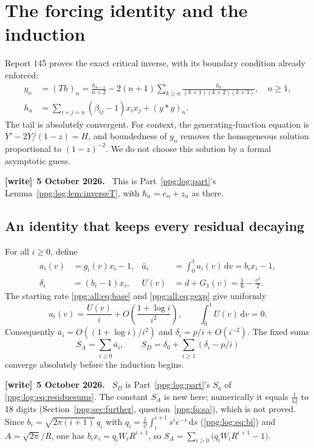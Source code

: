 \documentclass[11pt,letterpaper]{article}
\theoremstyle{remark}\newtheorem{remark}[theorem]{Remark}
\numberwithin{equation}{section}
\newcommand{\dd}{\mathrm d}
\newenvironment{writenote}[1][]{\par\smallskip\begingroup\small
 \noindent\textbf{[write]}\if\relax\detokenize{#1}\relax\else~\textbf{#1.}\fi\ }%
 {\par\endgroup\smallskip}
\begin{document}
\section{The forcing identity and the induction}\label{ppg:all:sec:induction}
Report 145 proves the exact critical inverse, with its boundary condition already enforced:
\begin{align}
 y_n&=(Th)_n=\frac{h_{n-1}}{n+2}
       -2(n+1)\sum_{k\ge n}\frac{h_k}{(k+1)(k+2)(k+3)},\quad n\ge1,
 \label{ppg:all:eq:T}\\
 h_n&=\sum_{i+j=n}(\beta_{ij}-1)x_ix_j+(y*y)_n.
 \label{ppg:all:eq:hdef}
\end{align}
The tail is absolutely convergent. For context, the generating-function equation is
$Y'-2Y/(1-z)=H$, and boundedness of $y_n$ removes the homogeneous solution proportional to $(1-z)^{-2}$. We do not choose this solution by a formal asymptotic guess.
\begin{writenote}[5 October 2026]
This is Part~\ref{ppg:log:part}'s Lemma~\ref{ppg:log:lem:inverseT}, with $h_n=e_n+z_n$ as there.
\end{writenote}

\subsection{An identity that keeps every residual decaying}
For all $i\ge0$, define
\begin{align}
 a_i(v)&=g_i(v)x_i-1,&\bar a_i&=\int_0^1a_i(v)\,\dd v=b_ix_i-1,
 \label{ppg:all:eq:an}\\
 \delta_i&=(b_i-1)x_i,& U(v)&=d+G_1(v)=\frac16-\frac{v^2}2.
 \label{ppg:all:eq:delta}
\end{align}
The starting rate \eqref{ppg:all:eq:base} and \eqref{ppg:all:eq:gexp} give uniformly
\begin{equation}\label{ppg:all:eq:U}
 a_i(v)=\frac{U(v)}i+O\!\left(\frac{1+\log i}{i^2}\right),\qquad
 \int_0^1U(v)\,\dd v=0.
\end{equation}
Consequently $\bar a_i=O((1+\log i)/i^2)$ and
$\delta_i=p/i+O(i^{-2})$. The fixed sums
\begin{equation}\label{ppg:all:eq:SA}
 S_A=\sum_{i\ge0}\bar a_i,\qquad
 S_D=\delta_0+\sum_{i\ge1}(\delta_i-p/i)
\end{equation}
converge absolutely before the induction begins.
\begin{writenote}[5 October 2026]
$S_D$ is Part~\ref{ppg:log:part}'s $S_a$ of \eqref{ppg:log:eq:residuesums}. The constant $S_A$ is new here; numerically it equals $\frac1{12}$ to 18 digits (Section~\ref{ppg:sec:further}, question~\ref{ppg:fq:sa}), which is not proved. Since $b_i=\sqrt{2\pi(i+1)}\,q_i$ with $q_i=\frac1{i!}\int_i^{i+1}s^ie^{-s}\,\dd s$ (\eqref{ppg:log:eq:bi}) and $A=\sqrt{2\pi}/R$, one has $b_ix_i=q_iW_iR^{i+1}$, so $S_A=\sum_{i\ge0}\bigl(q_iW_iR^{i+1}-1\bigr)$.
\end{writenote}
\end{document}
